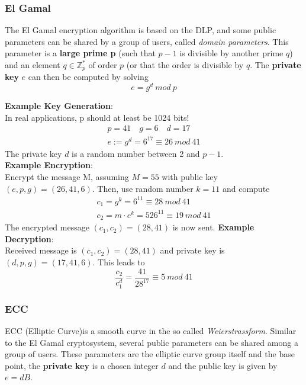 \documentclass[a4paper, 10 pt, conference]{ieeeconf}
\begin{document}
\vspace{0.5cm}
\subsubsection{\textbf{El Gamal}}

The El Gamal encryption algorithm is based on the DLP, and some public parameters can be shared by a group of users, called \emph{domain parameters}. This parameter is a \textbf{large prime p} (such that $p-1$ is divisible by another prime $q$) and an element $q \in \mathbb{Z}^{*}_{p}$ of order $p$ (or that the order is divisible by $q$. The \textbf{private key} $e$ can then be computed by solving
\begin{equation*}
e = g^{d} \ mod \ p
\end{equation*}

\textbf{Example Key Generation}: \\
In real applications, p should at least be 1024 bits!
\begin{align*}
p = 41 \quad g = 6 \quad d = 17 \\
e := g^{d} = 6^{17} \equiv 26 \ mod \ 41
\end{align*}
The private key $d$ is a random number between 2 and $p-1$. \\
\textbf{Example Encryption}: \\
Encrypt the message M, assuming $M=55$ with public key $(e,p,g) = (26,41,6)$. Then, use random number $k=11$ and compute 
\begin{align*}
c_1 = g^{k} = 6^{11} \equiv 28 \ mod \ 41 \\
c_2 = m\cdot e^{k} = 526^{11} \equiv 19 \ mod \ 41
\end{align*}
The encrypted message $(c_1,c_2) = (28,41)$ is now sent. 
\textbf{Example Decryption}: \\
Received message is $(c_1,c_2) = (28,41)$ and private key is $(d,p,g) = (17,41,6)$. This leads to 
\begin{equation*}
\frac{c_2}{c_1^{d}} = \frac{41}{28^{17}} \equiv 5 \ mod \ 41
\end{equation*}

\subsubsection{\textbf{ECC}}
ECC (Elliptic Curve)is a smooth curve in the so called \emph{Weierstrassform}. 
Similar to the El Gamal cryptosystem, several public parameters can be shared among a group of users.
These parameters are the elliptic curve group itself and the base point, the \textbf{private key} is a chosen integer $d$ and the public key is given by $e=dB$. 
\end{document}
